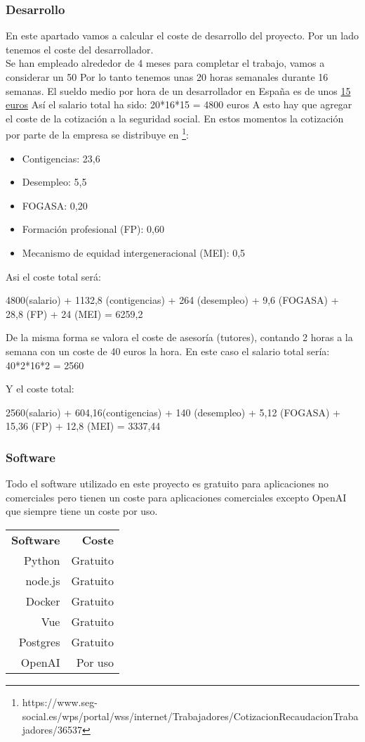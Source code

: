 \subsubsection{Desarrollo}
En este apartado vamos a calcular el coste de desarrollo del proyecto.
Por un lado tenemos el coste del desarrollador.\\
Se han empleado alrededor de 4 meses para completar el trabajo, vamos a considerar 
un 50%
Por lo tanto tenemos unas 20 horas semanales durante 16 semanas.
El sueldo medio por hora de un desarrollador en España es de unos \href{https://es.talent.com}{15 euros} 
Así el salario total ha sido: 20*16*15 = 4800 euros
A esto hay que agregar el coste de la cotización a la seguridad social.
En estos momentos la cotización por parte de la empresa se distribuye en 
\footnote{https://www.seg-social.es/wps/portal/wss/internet/Trabajadores/CotizacionRecaudacionTrabajadores/36537}:
\begin{itemize}
    \item Contigencias: 23,6%
    \item Desempleo: 5,5%
    \item FOGASA: 0,20
    \item Formación profesional (FP): 0,60%
    \item Mecanismo de equidad intergeneracional (MEI): 0,5%
\end{itemize}
Asi el coste total será:

4800(salario) + 1132,8 (contigencias) + 264 (desempleo) + 9,6 (FOGASA) + 28,8 (FP) + 24 (MEI) = 6259,2

De la misma forma se valora el coste de asesoría (tutores), contando 2 horas a la
 semana con un coste de 40 euros la hora. 
En este caso el salario total sería:
40*2*16*2 = 2560

Y el coste total: 

2560(salario) + 604,16(contigencias) +  140 (desempleo) + 5,12 (FOGASA) + 15,36 (FP) + 12,8 (MEI) = 3337,44

\subsubsection{Software}
Todo el software utilizado en este proyecto es gratuito para aplicaciones no comerciales pero tienen un 
coste para aplicaciones comerciales excepto OpenAI que siempre tiene un coste por uso.

\begin{tabular}{r r}
    \textbf{Software} & \textbf{Coste}\\
    Python & Gratuito \\
    node.js & Gratuito\\
    Docker & Gratuito\\
    Vue & Gratuito\\
    Postgres & Gratuito\\
    OpenAI & Por uso\\
\end{tabular}


